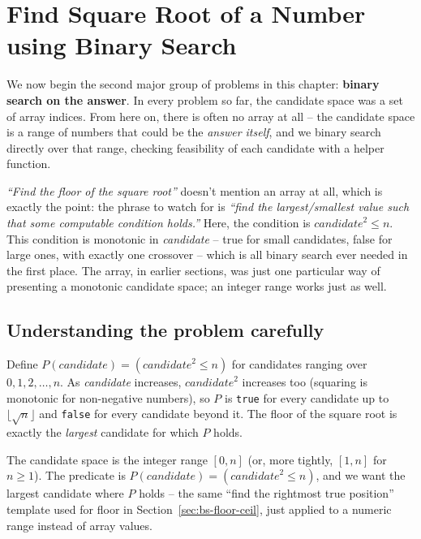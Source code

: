 \section{Find Square Root of a Number using Binary Search}
\label{sec:bs-sqrt}

\noindent We now begin the second major group of problems in this chapter:
\textbf{binary search on the answer}. In every problem so far, the
candidate space was a set of array indices. From here on, there is often no
array at all -- the candidate space is a range of numbers that could be the
\emph{answer itself}, and we binary search directly over that range,
checking feasibility of each candidate with a helper function.


\begin{patternbox}
\emph{``Find the floor of the square root''} doesn't mention an array at
all, which is exactly the point: the phrase to watch for is \emph{``find
the largest/smallest value such that some computable condition holds.''}
Here, the condition is $\textit{candidate}^2 \le n$. This condition is
monotonic in \textit{candidate} -- true for small candidates, false for
large ones, with exactly one crossover -- which is all binary search ever
needed in the first place. The array, in earlier sections, was just one
particular way of presenting a monotonic candidate space; an integer range
works just as well.
\end{patternbox}

\subsection*{Understanding the problem carefully}

Define $P(\textit{candidate}) = (\textit{candidate}^2 \le n)$ for
candidates ranging over $0, 1, 2, \dots, n$. As \textit{candidate}
increases, $\textit{candidate}^2$ increases too (squaring is monotonic for
non-negative numbers), so $P$ is \texttt{true} for every candidate up to
$\lfloor \sqrt{n} \rfloor$ and \texttt{false} for every candidate beyond
it. The floor of the square root is exactly the \emph{largest} candidate
for which $P$ holds.

\begin{ideabox}
The candidate space is the integer range $[0, n]$ (or, more tightly,
$[1, n]$ for $n \ge 1$). The predicate is
$P(\textit{candidate}) = (\textit{candidate}^2 \le n)$, and we want the
largest candidate where $P$ holds -- the same ``find the rightmost true
position'' template used for floor in Section~\ref{sec:bs-floor-ceil},
just applied to a numeric range instead of array values.
\end{ideabox}

